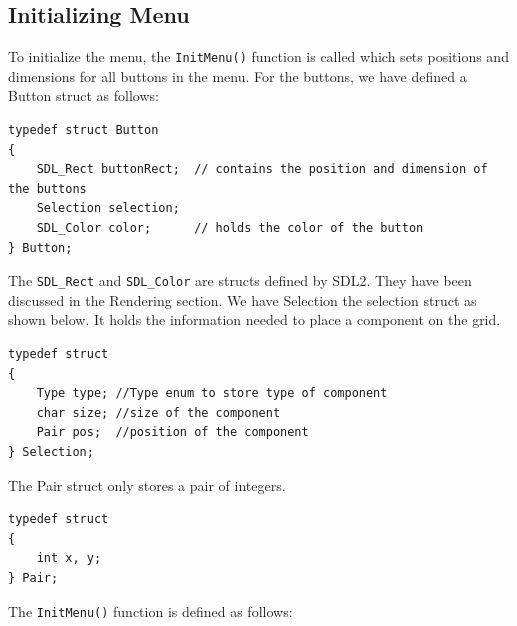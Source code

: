 \documentclass[report]{subfiles}
\begin{document}
    \subsection{Initializing Menu}
    To initialize the menu, the \texttt{InitMenu()} function is called which sets positions and dimensions for all buttons in the menu. For the buttons, we have defined a Button struct as follows:
    \begin{lstlisting}
typedef struct Button
{
    SDL_Rect buttonRect;  // contains the position and dimension of the buttons
    Selection selection;
    SDL_Color color;      // holds the color of the button
} Button;
    \end{lstlisting}
    The \texttt{SDL\_Rect} and \texttt{SDL\_Color} are structs defined by SDL2. They have been discussed in the Rendering section. We have Selection the selection struct as shown below. It holds the information needed to place a component on the grid.
    \begin{lstlisting}
typedef struct
{
    Type type; //Type enum to store type of component
    char size; //size of the component
    Pair pos;  //position of the component
} Selection;
    \end{lstlisting}
    The Pair struct only stores a pair of integers.
    \begin{lstlisting}
typedef struct
{
    int x, y;
} Pair;
    \end{lstlisting}
    The \texttt{InitMenu()} function is defined as follows:
\end{document}
